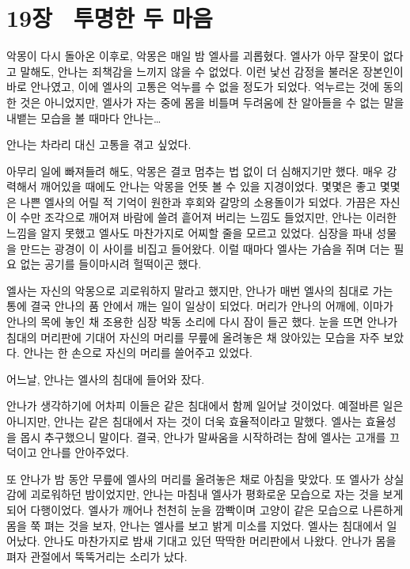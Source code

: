 

\chapter[19장  투명한 두 마음][19장\hspace*{.5em}투명한 두 마음]{19장 \ 투명한 두 마음}



악몽이 다시 돌아온 이후로, 악몽은 매일 밤 엘사를 괴롭혔다. 엘사가 아무 잘못이 없다고 말해도, 안나는 죄책감을 느끼지 않을 수 없었다. 이런 낯선 감정을 불러온 장본인이 바로 안나였고, 이에 엘사의 고통은 억누를 수 없을 정도가 되었다. 억누르는 것에 동의한 것은 아니었지만, 엘사가 자는 중에 몸을 비틀며 두려움에 찬 알아들을 수 없는 말을 내뱉는 모습을 볼 때마다 안나는\ldots

안나는 차라리 대신 고통을 겪고 싶었다.

아무리 일에 빠져들려 해도, 악몽은 결코 멈추는 법 없이 더 심해지기만 했다. 매우 강력해서 깨어있을 때에도 안나는 악몽을 언뜻 볼 수 있을 지경이었다. 몇몇은 좋고 몇몇은 나쁜 엘사의 어릴 적 기억이 원한과 후회와 갈망의 소용돌이가 되었다. 가끔은 자신이 수만 조각으로 깨어져 바람에 쓸려 흩어져 버리는 느낌도 들었지만, 안나는 이러한 느낌을 알지 못했고 엘사도 마찬가지로 어찌할 줄을 모르고 있었다. 심장을 파내 성물을 만드는 광경이 이 사이를 비집고 들어왔다. 이럴 때마다 엘사는 가슴을 쥐며 더는 필요 없는 공기를 들이마시려 헐떡이곤 했다.

엘사는 자신의 악몽으로 괴로워하지 말라고 했지만, 안나가 매번 엘사의 침대로 가는 통에 결국 안나의 품 안에서 깨는 일이 일상이 되었다. 머리가 안나의 어깨에, 이마가 안나의 목에 놓인 채 조용한 심장 박동 소리에 다시 잠이 들곤 했다. 눈을 뜨면 안나가 침대의 머리판에 기대어 자신의 머리를 무릎에 올려놓은 채 앉아있는 모습을 자주 보았다. 안나는 한 손으로 자신의 머리를 쓸어주고 있었다.

어느날, 안나는 엘사의 침대에 들어와 잤다.

안나가 생각하기에 어차피 이들은 같은 침대에서 함께 일어날 것이었다. 예절바른 일은 아니지만, 안나는 같은 침대에서 자는 것이 더욱 효율적이라고 말했다. 엘사는 효율성을 몹시 추구했으니 말이다. 결국, 안나가 말싸움을 시작하려는 참에 엘사는 고개를 끄덕이고 안나를 안아주었다.

또 안나가 밤 동안 무릎에 엘사의 머리를 올려놓은 채로 아침을 맞았다. 또 엘사가 상실감에 괴로워하던 밤이었지만, 안나는 마침내 엘사가 평화로운 모습으로 자는 것을 보게 되어 다행이었다. 엘사가 깨어나 천천히 눈을 깜빡이며 고양이 같은 모습으로 나른하게 몸을 쭉 펴는 것을 보자, 안나는 엘사를 보고 밝게 미소를 지었다. 엘사는 침대에서 일어났다. 안나도 마찬가지로 밤새 기대고 있던 딱딱한 머리판에서 나왔다. 안나가 몸을 펴자 관절에서 뚝뚝거리는 소리가 났다.

